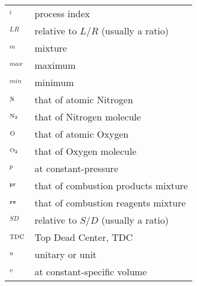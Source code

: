 \begin{xtabular}{@{}p{\lensymb}@{}p{\lenWHAT}}
    ${}_i$                                  & process index                                                                 \\
    ${}_{LR}$                               & relative to $L/R$ (usually a ratio)                                           \\
    ${}_m$                                  & mixture                                                                       \\
    ${}_{max}$                              & maximum                                                                       \\
    ${}_{min}$                              & minimum                                                                       \\
    ${}_{\mbox{\scriptsize \ce{N}}}$        & that of atomic Nitrogen                                                       \\
    ${}_{\mbox{\scriptsize \ce{N2}}}$       & that of Nitrogen molecule                                                     \\
    ${}_{\mbox{\scriptsize \ce{O}}}$        & that of atomic Oxygen                                                         \\
    ${}_{\mbox{\scriptsize \ce{O2}}}$       & that of Oxygen molecule                                                       \\
    ${}_p$                                  & at constant-pressure                                                          \\
    ${}_{\mbox{\scriptsize\tt pr}}$         & that of combustion products mixture                                           \\
    ${}_{\mbox{\scriptsize\tt re}}$         & that of combustion reagents mixture                                           \\
    ${}_{SD}$                               & relative to $S/D$ (usually a ratio)                                           \\
    ${}_{{\mbox{\scriptsize TDC}}}$                             & Top Dead Center, TDC                                                          \\
    ${}_u$                                  & unitary or unit                                                               \\
    ${}_v$                                  & at constant-specific volume                                                   \\
\end{xtabular}
                                                                                                                      
